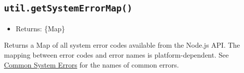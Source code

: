 \begin{Shaded}
\begin{Highlighting}[]
\NormalTok{(}\OperatorTok{,}\KeywordTok{=\textgreater{}}\NormalTok{ \{}
  \OperatorTok{=}\NormalTok{)}\OperatorTok{;}
  \OperatorTok{;}  
\NormalTok{\})}\OperatorTok{;}
\end{Highlighting}
\end{Shaded}

\subsection{\texorpdfstring{\texttt{util.getSystemErrorMap()}}{util.getSystemErrorMap()}}\label{util.getsystemerrormap}

\begin{itemize}
\tightlist
\item
  Returns: \{Map\}
\end{itemize}

Returns a Map of all system error codes available from the Node.js API.
The mapping between error codes and error names is platform-dependent.
See \href{errors.md\#common-system-errors}{Common System Errors} for the
names of common errors.

\begin{Shaded}
\begin{Highlighting}[]
\NormalTok{(}\OperatorTok{,}\KeywordTok{=\textgreater{}}\NormalTok{ \{}
  \OperatorTok{=}\NormalTok{()}\OperatorTok{;}
  \OperatorTok{=}\NormalTok{)}\OperatorTok{;}
  \OperatorTok{;}  
\NormalTok{\})}\OperatorTok{;}
\end{Highlighting}
\end{Shaded}

